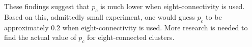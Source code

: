 These findings suggest that $p_c$ is much lower when eight-connectivity is used. Based on this, admittedly small experiment, one would guess $p_c$ to be approximately $0.2$ when eight-connectivity is used. More research is needed to find the actual value of $p_c$ for eight-connected clusters.\\





